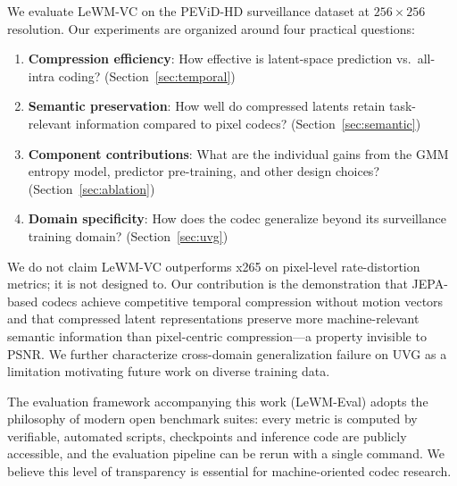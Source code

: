 \documentclass{article}
\begin{document}
We evaluate LeWM-VC on the PEViD-HD surveillance dataset at $256 \times 256$ resolution. Our experiments are organized around four practical questions:
\begin{enumerate}
    \item \textbf{Compression efficiency}: How effective is latent-space prediction vs.\ all-intra coding? (Section~\ref{sec:temporal})
    \item \textbf{Semantic preservation}: How well do compressed latents retain task-relevant information compared to pixel codecs? (Section~\ref{sec:semantic})
    \item \textbf{Component contributions}: What are the individual gains from the GMM entropy model, predictor pre-training, and other design choices? (Section~\ref{sec:ablation})
    \item \textbf{Domain specificity}: How does the codec generalize beyond its surveillance training domain? (Section~\ref{sec:uvg})
\end{enumerate}

We do not claim LeWM-VC outperforms x265 on pixel-level rate-distortion metrics; it is not designed to. Our contribution is the demonstration that JEPA-based codecs achieve competitive temporal compression without motion vectors and that compressed latent representations preserve more machine-relevant semantic information than pixel-centric compression---a property invisible to PSNR. We further characterize cross-domain generalization failure on UVG as a limitation motivating future work on diverse training data.

The evaluation framework accompanying this work (LeWM-Eval) adopts the philosophy of modern open benchmark suites: every metric is computed by verifiable, automated scripts, checkpoints and inference code are publicly accessible, and the evaluation pipeline can be rerun with a single command. We believe this level of transparency is essential for machine-oriented codec research.
\end{document}
